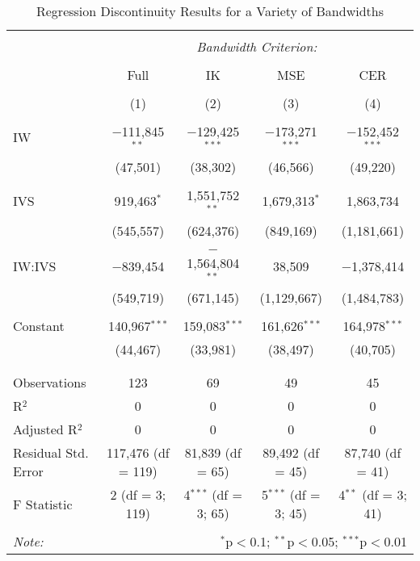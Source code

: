 \begin{table}[H] \centering 
  \caption{Regression Discontinuity Results for a Variety of Bandwidths} 
  \label{} 
\small 
\begin{tabular}{lcccc} 
\\[-1.8ex]\hline 
\hline \\[-1.8ex] 
 & \multicolumn{4}{c}{\textit{Bandwidth Criterion:}} \\ 
\cline{2-5} 
\\
 & Full & IK & MSE & CER \\ 
\\[-1.8ex] & (1) & (2) & (3) & (4)\\ 
\hline \\[-1.8ex] 
 IW & $-$111,845$^{**}$ & $-$129,425$^{***}$ & $-$173,271$^{***}$ & $-$152,452$^{***}$ \\ 
  & (47,501) & (38,302) & (46,566) & (49,220) \\ 
  & & & & \\ 
 IVS & 919,463$^{*}$ & 1,551,752$^{**}$ & 1,679,313$^{*}$ & 1,863,734 \\ 
  & (545,557) & (624,376) & (849,169) & (1,181,661) \\ 
  & & & & \\ 
 IW:IVS & $-$839,454 & $-$1,564,804$^{**}$ & 38,509 & $-$1,378,414 \\ 
  & (549,719) & (671,145) & (1,129,667) & (1,484,783) \\ 
  & & & & \\ 
 Constant & 140,967$^{***}$ & 159,083$^{***}$ & 161,626$^{***}$ & 164,978$^{***}$ \\ 
  & (44,467) & (33,981) & (38,497) & (40,705) \\ 
  & & & & \\ 
\hline \\[-1.8ex] 
Observations & 123 & 69 & 49 & 45 \\ 
R$^{2}$ & 0 & 0 & 0 & 0 \\ 
Adjusted R$^{2}$ & 0 & 0 & 0 & 0 \\ 
Residual Std. Error & 117,476 (df = 119) & 81,839 (df = 65) & 89,492 (df = 45) & 87,740 (df = 41) \\ 
F Statistic & 2 (df = 3; 119) & 4$^{***}$ (df = 3; 65) & 5$^{***}$ (df = 3; 45) & 4$^{**}$ (df = 3; 41) \\ 
\hline 
\hline \\[-1.8ex] 
\textit{Note:}  & \multicolumn{4}{r}{$^{*}$p$<$0.1; $^{**}$p$<$0.05; $^{***}$p$<$0.01} \\ 
\end{tabular} 
\end{table} 

